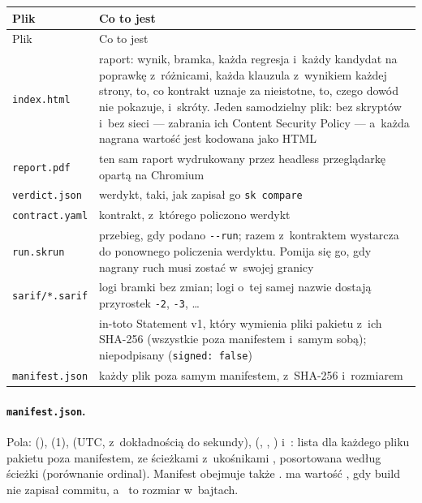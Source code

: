 {\small
\begin{xltabular}{\linewidth}{@{}>{\raggedright\arraybackslash}p{3.6cm} >{\raggedright\arraybackslash}X@{}}
\toprule
Plik & Co to jest \\
\midrule
\endfirsthead
\toprule
Plik & Co to jest \\
\midrule
\endhead
\bottomrule
\endlastfoot
\texttt{index.html} & raport: wynik, bramka, każda regresja i~każdy kandydat na poprawkę z~różnicami, każda klauzula z~wynikiem każdej strony, to, co kontrakt uznaje za nieistotne, to,
czego dowód nie pokazuje, i~skróty. Jeden samodzielny plik: bez skryptów i~bez sieci ---
zabrania ich Content Security Policy --- a~każda nagrana wartość jest kodowana jako HTML \\
\texttt{report.pdf} & ten sam raport wydrukowany przez headless przeglądarkę opartą na
Chromium \\
\texttt{verdict.json} & werdykt, taki, jak zapisał go \texttt{sk compare} \\
\texttt{contract.yaml} & kontrakt, z~którego policzono werdykt \\
\texttt{run.skrun} & przebieg, gdy podano \texttt{-{}-run}; razem z~kontraktem wystarcza do
ponownego policzenia werdyktu. Pomija się go, gdy nagrany ruch musi zostać w~swojej granicy \\
\texttt{sarif/*.sarif} & logi bramki bez zmian; logi o~tej samej nazwie dostają przyrostek
\texttt{-2}, \texttt{-3}, … \\
 & in-toto Statement v1, który wymienia pliki pakietu z~ich
SHA-256 (wszystkie poza manifestem i~samym sobą); niepodpisany (\texttt{\textquotedbl{}signed\textquotedbl{}: false}) \\
\texttt{manifest.json} & każdy plik poza samym manifestem, z~SHA-256 i~rozmiarem \\
\end{xltabular}
}

\paragraph{\texttt{manifest.json}.} Pola:  (),
 (1),  (UTC, z~dokładnością do sekundy), 
(, , ) i~: lista
 dla każdego pliku pakietu poza manifestem, ze ścieżkami z~ukośnikami \repopath{/}, posortowana według ścieżki (porównanie ordinal). Manifest obejmuje także
.  ma wartość , gdy build nie
zapisał commitu, a~ to rozmiar w~bajtach.

